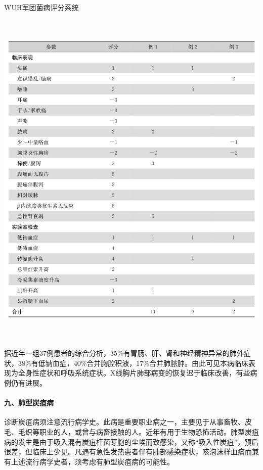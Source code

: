 \begin{table}[htbp]
\centering
\caption{WUH军团菌病评分系统}
\label{tab2-10}
\includegraphics[width=6.03125in,height=6.58333in]{./images/Image00015.jpg}
\end{table}


据近年一组37例患者的综合分析，35\%有胃肠、肝、肾和神经精神异常的肺外症状，38\%有低钠血症，40\%合并胸腔积液，17\%合并肺脓肿。由此可见本病临床表现为全身性症状和呼吸系统症状。X线胸片肺部病变的恢复迟于临床改善，有些病例仍有进展。

\paragraph{九、肺型炭疽病}

诊断炭疽病须注意流行病学史。此病是重要职业病之一，主要见于从事畜牧、皮毛、毛织等职业的人，或曾与病畜接触的人。近年有用于生物恐怖活动。肺型炭疽病的发生是由于吸入混有炭疽杆菌芽胞的尘埃而致感染，又称“吸入性炭疽”，预后很差，但临床上少见。凡遇有急性发热患者伴有肺部感染症状，咳泡沫样血痰而兼有上述流行病学史者，须考虑有肺型炭疽病的可能性。

